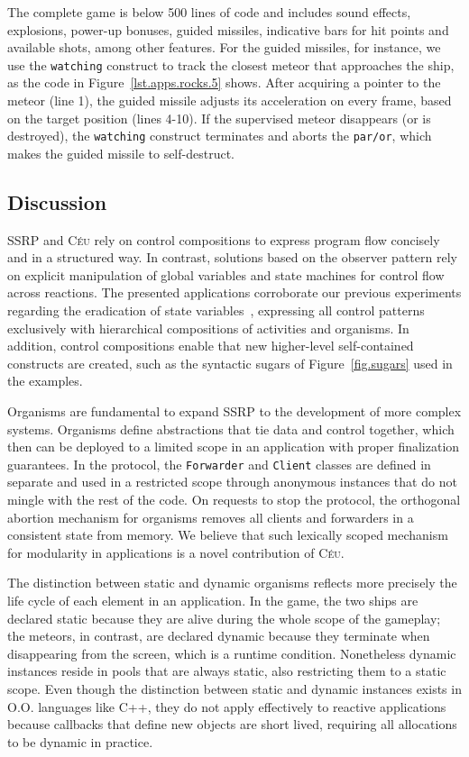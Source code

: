 \documentclass{sigplanconf}
\newcommand{\CEU}{\textsc{C\'{e}u}\xspace}
\newcommand{\code}[1] {{\small{\texttt{#1}}}}
\newcommand{\1}{\;}
\newcommand{\2}{\;\;}
\newcommand{\3}{\;\;\;}
\newcommand{\5}{\;\;\;\;\;}
\begin{document}
The complete game is below 500 lines of code and includes sound effects, 
explosions, power-up bonuses, guided missiles, indicative bars for hit points 
and available shots, among other features.
%
For the guided missiles, for instance, we use the \code{watching} construct to 
track the closest meteor that approaches the ship, as the code in 
Figure~\ref{lst.apps.rocks.5} shows.
After acquiring a pointer to the meteor (line 1), the guided missile adjusts 
its acceleration on every frame, based on the target position (lines 4-10).
%
If the supervised meteor disappears (or is destroyed), the \code{watching} 
construct terminates and aborts the \code{par/or}, which makes the guided 
missile to self-destruct.

\subsection{Discussion}

SSRP and \CEU rely on control compositions to express program flow concisely 
and in a structured way.
%
In contrast, solutions based on the observer pattern rely on explicit 
manipulation of global variables and state machines for control flow across 
reactions.
%
The presented applications corroborate our previous experiments regarding the 
eradication of state variables~\cite{ceu.sensys13}, expressing all control 
patterns exclusively with hierarchical compositions of activities and 
organisms.
%
In addition, control compositions enable that new higher-level self-contained 
constructs are created, such as the syntactic sugars of Figure~\ref{fig.sugars} 
used in the examples.

Organisms are fundamental to expand SSRP to the development of more complex 
systems.
%
Organisms define abstractions that tie data and control together, which then 
can be deployed to a limited scope in an application with proper finalization 
guarantees.
%
In the protocol, the \code{Forwarder} and \code{Client} classes are defined in 
separate and used in a restricted scope through anonymous instances that do not 
mingle with the rest of the code.
On requests to stop the protocol, the orthogonal abortion mechanism for 
organisms removes all clients and forwarders in a consistent state from memory.
%
We believe that such lexically scoped mechanism for modularity in applications 
is a novel contribution of \CEU.

The distinction between static and dynamic organisms reflects more precisely 
the life cycle of each element in an application.
%
In the game, the two ships are declared static because they are alive during 
the whole scope of the gameplay; the meteors, in contrast, are declared dynamic 
because they terminate when disappearing from the screen, which is a runtime 
condition.
Nonetheless dynamic instances reside in pools that are always static, also
restricting them to a static scope.
%
Even though the distinction between static and dynamic instances exists in O.O.  
languages like C++, they do not apply effectively to reactive applications 
because callbacks that define new objects are short lived, requiring all 
allocations to be dynamic in practice.
\end{document}
